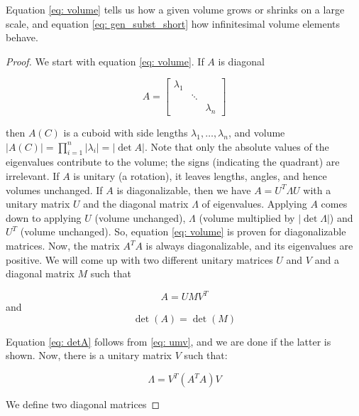 \documentclass{article}
\begin{document}
Equation \ref{eq: volume} tells us how a given volume grows or shrinks on a large scale, and equation \ref{eq: gen_subst_short} how infinitesimal volume elements behave.


\begin{proof}
We start with equation \ref{eq: volume}. If $A$ is diagonal 

\begin{equation*}
    A = \left[
    \begin{array}{ccc}
        \lambda_{1}&   \\
            & \ddots  \\
            && \lambda_{n}
    \end{array}
\right]
\end{equation*}

then $A(C)$ is a cuboid with side lengths $\lambda_1, \hdots, \lambda_n$, and volume $\lvert A(C)\rvert = \prod_{i = 1}^{n} \lvert \lambda_i \rvert = \lvert \det A \rvert$. Note that only the absolute values of the eigenvalues contribute to the volume; the signs (indicating the quadrant) are irrelevant.
If $A$ is unitary (a rotation), it leaves lengths, angles, and hence volumes unchanged. If $A$ is diagonalizable, then we have $A = U^T \Lambda U$ with a unitary matrix $U$ and the diagonal matrix $\Lambda$ of eigenvalues. Applying $A$ comes down to applying $U$ (volume unchanged), $\Lambda$ (volume multiplied by $\lvert \det \Lambda \rvert$) and $U^T$ (volume unchanged). So, equation \ref{eq: volume} is proven for diagonalizable matrices. Now, the matrix $A^TA$ is always diagonalizable, and its eigenvalues are positive. We will come up with two different unitary matrices $U$ and $V$ and a diagonal matrix $M$ such that

\begin{equation} \label{eq: umv}
A = UMV^T
\end{equation}
and 
\begin{equation} \label{eq: detA}
\det(A) = \det(M)
\end{equation}

Equation \ref{eq: detA} follows from \ref{eq: umv}, and we are done if the latter is shown. Now, there is a unitary matrix $V$ such that:

\begin{equation} \label{eq:Lambda}
\Lambda = V^{T}(A^TA)V
\end{equation}

We define two diagonal matrices


\end{proof}
\end{document}
